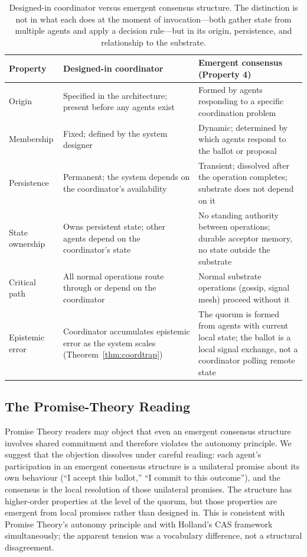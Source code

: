 \documentclass[11pt]{article}
\theoremstyle{definition}
\theoremstyle{plain}
\theoremstyle{plain}
\begin{document}
\begin{table}[!ht]
\centering
\small
\begin{tabularx}{\textwidth}{lXX}
\toprule
\textbf{Property} &
\textbf{Designed-in coordinator} &
\textbf{Emergent consensus (Property 4)} \\
\midrule
Origin &
Specified in the architecture; present before any agents exist &
Formed by agents responding to a specific coordination problem \\
\addlinespace
Membership &
Fixed; defined by the system designer &
Dynamic; determined by which agents respond to the ballot or proposal \\
\addlinespace
Persistence &
Permanent; the system depends on the coordinator's availability &
Transient; dissolved after the operation completes; substrate does not depend on it \\
\addlinespace
State ownership &
Owns persistent state; other agents depend on the coordinator's state &
No standing authority between operations; durable acceptor memory, no state outside the substrate \\
\addlinespace
Critical path &
All normal operations route through or depend on the coordinator &
Normal substrate operations (gossip, signal mesh) proceed without it \\
\addlinespace
Epistemic error &
Coordinator accumulates epistemic error as the system scales (Theorem~\ref{thm:coordtrap}) &
The quorum is formed from agents with current local state; the ballot is a local signal exchange, not a coordinator polling remote state \\
\bottomrule
\end{tabularx}
\caption{Designed-in coordinator versus emergent consensus structure. The
distinction is not in what each does at the moment of invocation---both
gather state from multiple agents and apply a decision rule---but in its
origin, persistence, and relationship to the substrate.}
\label{tab:designed-vs-emergent}
\end{table}

\subsection{The Promise-Theory Reading}

Promise Theory readers may object that even an emergent consensus structure
involves shared commitment and therefore violates the autonomy principle. We
suggest that the objection dissolves under careful reading: each agent's
participation in an emergent consensus structure is a unilateral promise
about its own behaviour (``I accept this ballot,'' ``I commit to this
outcome''), and the consensus is the local resolution of those unilateral
promises. The structure has higher-order properties at the level of the
quorum, but those properties are emergent from local promises rather than
designed in. This is consistent with Promise Theory's autonomy principle and
with Holland's CAS framework simultaneously; the apparent tension was a
vocabulary difference, not a structural disagreement.
\end{document}
